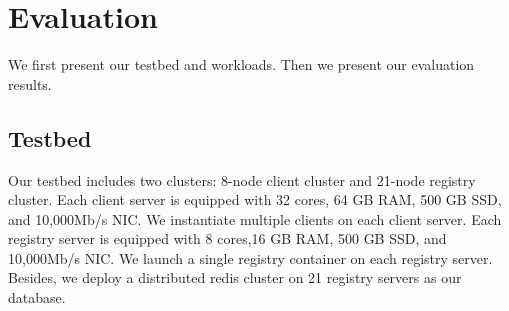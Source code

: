 \section{ Evaluation}
\label{sec:Evaluation}


We first present our testbed and workloads.
Then we present our evaluation results.
\subsection{Testbed}

Our testbed includes two clusters: 
8-node client cluster and
21-node registry cluster.
Each client server is equipped with 32 cores, 64 GB RAM, 500 GB SSD, and 10,000Mb/s NIC. 
We instantiate multiple clients on each client server.
Each registry server is equipped with 8 cores,16 GB RAM, 500 GB SSD, and 10,000Mb/s NIC. 
We launch a single registry container on each registry server.
Besides,
we deploy a distributed redis cluster on 21 registry servers as our database.
